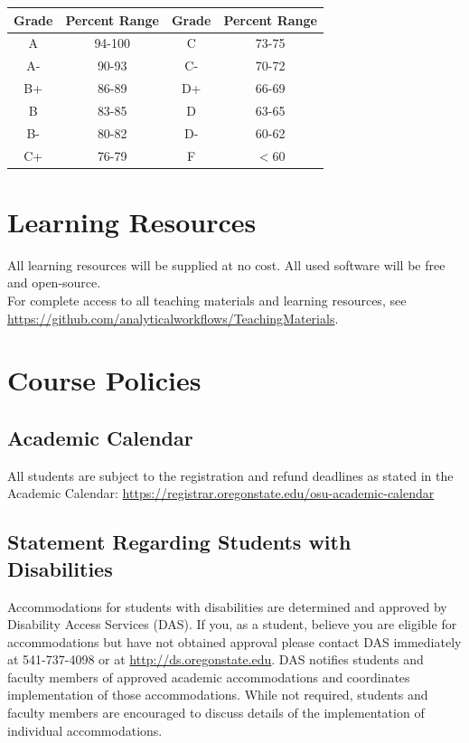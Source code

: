\documentclass[10pt]{article}
\begin{document}
\begin{center}
\begin{tabular}{|c|c||c|c|}
	\hline
	Grade &  Percent Range & Grade  & Percent Range   \\
	\hline
	\hline
	A & 94-100 &  C &  73-75 \\
	\hline
	A-&  90-93&  C-&  70-72  \\
	\hline
	B+& 86-89 &  D+& 66-69 \\
	\hline
	B & 83-85 &  D&  63-65 \\
	\hline
	B- & 80-82 & D- &  60-62 \\
	\hline
	C+&  76-79&  F & $< 60$ \\
	\hline
	\hline
\end{tabular}
\end{center}



\section*{Learning Resources}
All learning resources will be supplied at no cost. 
All used software will be free and open-source.\\ 
For complete access to all teaching materials and learning resources, see\\
\url{https://github.com/analyticalworkflows/TeachingMaterials}.

\clearpage

\section*{Course Policies }


\subsection*{Academic Calendar}
All students are subject to the registration and refund deadlines as stated in the Academic Calendar: 
\url{https://registrar.oregonstate.edu/osu-academic-calendar}

\subsection*{Statement Regarding Students with Disabilities}
Accommodations for students with disabilities are determined and approved by Disability Access 
Services (DAS). 
If you, as a student, believe you are eligible for accommodations but have not obtained 
approval please contact DAS immediately at 541-737-4098 or at \url{http://ds.oregonstate.edu}. 
DAS notifies 
students and faculty members of approved academic accommodations and coordinates implementation 
of those accommodations. 
While not required, students and faculty members are encouraged to discuss 
details of the implementation of individual accommodations.
\end{document}
